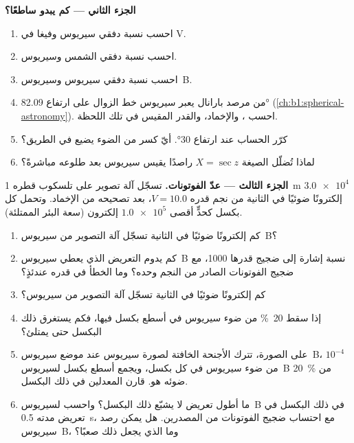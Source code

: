 \begin{problem}
\medskip
\noindent\textbf{الجزء الثاني --- كم يبدو ساطعًا؟}
\begin{enumerate}[resume]
  \item احسب نسبة دفقي سيريوس وفيغا في V.
  \item احسب نسبة دفقي الشمس وسيريوس.
  \item احسب نسبة دفقي سيريوس وسيريوس~B.
  \item من مرصد بارانال يعبر سيريوس خط الزوال على ارتفاع \ang{82.09} (\cref{ch:b1:spherical-astronomy}). احسب ، والإخماد، والقدر المقيس في تلك اللحظة.
  \item كرّر الحساب عند ارتفاع \ang{30}. أيّ كسر من الضوء يضيع في الطريق؟
  \item لماذا تُضلّل الصيغة $X = \sec z$ راصدًا يقيس سيريوس بعد طلوعه مباشرةً؟
\end{enumerate}

\medskip
\noindent\textbf{الجزء الثالث --- عدّ الفوتونات.}
تسجّل آلة تصوير على تلسكوب قطره \qty{1}{m} $\num{3.0e4}$ إلكترونًا ضوئيًا في الثانية من نجم قدره $V = 10.0$، بعد تصحيحه من الإخماد. وتحمل كل بكسل كحدٍّ أقصى $\num{1.0e5}$ إلكترون (سعة البئر الممتلئة).
\begin{enumerate}[resume]
  \item كم إلكترونًا ضوئيًا في الثانية تسجّل آلة التصوير من سيريوس~B؟
  \item كم يدوم التعريض الذي يعطي سيريوس~B نسبة إشارة إلى ضجيج قدرها 1000، مع ضجيج الفوتونات الصادر من النجم وحده؟ وما الخطأ في قدره عندئذٍ؟
  \item كم إلكترونًا ضوئيًا في الثانية تسجّل آلة التصوير من سيريوس؟
  \item إذا سقط \qty{20}{\percent} من ضوء سيريوس في أسطع بكسل فيها، فكم يستغرق ذلك البكسل حتى يمتلئ؟
  \item على الصورة، تترك الأجنحة الخافتة لصورة سيريوس عند موضع سيريوس~B، $10^{-4}$ من ضوء سيريوس في كل بكسل، ويجمع أسطع بكسل لسيريوس~B \qty{20}{\percent} من ضوئه هو. قارن المعدلين في ذلك البكسل.
  \item ما أطول تعريض لا يشبّع ذلك البكسل؟ واحسب  لسيريوس~B في ذلك البكسل في تعريض مدته \qty{0.5}{s}، مع احتساب ضجيج الفوتونات من المصدرين. هل يمكن رصد سيريوس~B، وما الذي يجعل ذلك صعبًا؟
\end{enumerate}


\end{problem}
